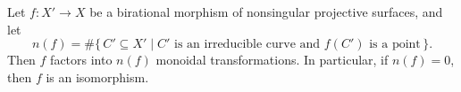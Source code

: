Let $f: X' \to X$ be a birational morphism of nonsingular projective surfaces, and let
$$n(f) = \#\{\,C' \subseteq X' \mid C' \text{ is an irreducible curve and } f(C') \text{ is a point}\,\}.$$
Then $f$ factors into $n(f)$ monoidal transformations. In particular, if $n(f) = 0$, then $f$ is an isomorphism.

